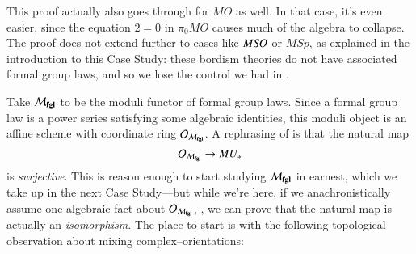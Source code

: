 \begin{remark}
This proof actually also goes through for $MO$ as well.  In that case, it's even easier, since the equation $2 = 0$ in $\pi_0 MO$ causes much of the algebra to collapse.  The proof does not extend further to cases like $M\mathit{SO}$ or $M\mathit{Sp}$, as explained in the introduction to this Case Study: these bordism theories do not have associated formal group laws, and so we lose the control we had in .
\end{remark}

Take $\mathcal{M}_{\mathbf{fgl}}$ to be the moduli functor of formal group laws.  Since a formal group law is a power series satisfying some algebraic identities, this moduli object is an affine scheme with coordinate ring $\mathcal{O}_{\mathcal{M}_{\mathbf{fgl}}}$.  A rephrasing of  is that the natural map \[\mathcal{O}_{\mathcal{M}_{\mathbf{fgl}}} \to MU_*\] is \emph{surjective}.  This is reason enough to start studying $\mathcal{M}_{\mathbf{fgl}}$ in earnest, which we take up in the next Case Study---but while we're here, if we anachronistically assume one algebraic fact about $\mathcal{O}_{\mathcal{M}_{\mathbf{fgl}}}$, , we can prove that the natural map is actually an \emph{isomorphism}.  The place to start is with the following topological observation about mixing complex--orientations:


